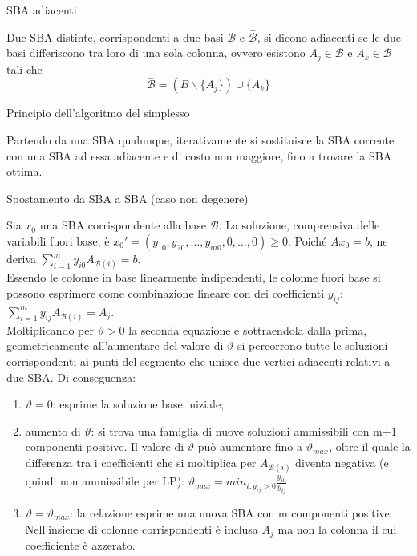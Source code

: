 \documentclass[answers, a4paper, 11pt]{exam}
\begin{document}
\begin{questions}
\question SBA adiacenti
\begin{solution}
Due SBA distinte, corrispondenti a due basi $\mathcal{B}$ e $\stackrel{-}{\mathcal{B}}$, si dicono adiacenti se le due basi differiscono tra loro di una sola colonna, ovvero esistono $A_{j} \in \mathcal{B}$ e $A_{k} \in \stackrel{-}{\mathcal{B}}$ tali che $$\stackrel{-}{\mathcal{B}} = (B \backslash \{A_{j}\}) \cup \{A_{k}\}$$
\end{solution}
\question Principio dell'algoritmo del simplesso
\begin{solution}
Partendo da una SBA qualunque, iterativamente si sostituisce la SBA corrente con una SBA ad essa adiacente e di costo non maggiore, fino a trovare la SBA ottima.
\end{solution}
\question Spostamento da SBA a SBA (caso non degenere)
\begin{solution}
Sia $x_{0}$ una SBA corrispondente alla base $\mathcal{B}$. La soluzione, comprensiva delle variabili fuori base, è $x_{0}' = (y_{10},y_{20},\ldots,y_{m0}, 0,\ldots, 0) \ge 0$. Poiché $Ax_{0}=b$, ne deriva $\sum_{i=1}^m y_{i0} A_{\mathcal{B}(i)}=b$.\\ Essendo le colonne in base linearmente indipendenti, le colonne fuori base si possono esprimere come combinazione lineare con dei coefficienti $y_{ij}$: $\sum_{i=1}^m y_{ij} A_{\mathcal{B}(i)}=A_{j}$.\\ Moltiplicando per $\vartheta > 0$ la seconda equazione e sottraendola dalla prima, geometricamente all'aumentare del valore di $\vartheta$ si percorrono tutte le soluzioni corrispondenti ai punti del segmento che unisce due vertici adiacenti relativi a due SBA. Di conseguenza:
\begin{enumerate}
\item $\vartheta = 0$: esprime la soluzione base iniziale;
\item aumento di $\vartheta$: si trova una famiglia di nuove soluzioni ammissibili con m+1 componenti positive. Il valore di $\vartheta$ può aumentare fino a $\vartheta_{max}$, oltre il quale la differenza tra i coefficienti che si moltiplica per $A_{\mathcal{B}(i)}$ diventa negativa (e quindi non ammissibile per LP): $\vartheta_{max} = min_{i:y_{ij}>0} \frac{y_{i0}}{y_{ij}}$
\item $\vartheta = \vartheta_{max}$: la relazione esprime una nuova SBA con m componenti positive. Nell'insieme di colonne corrispondenti è inclusa $A_{j}$ ma non la colonna il cui coefficiente è azzerato.
\end{enumerate}

\end{solution}
\end{questions}
\end{document}

